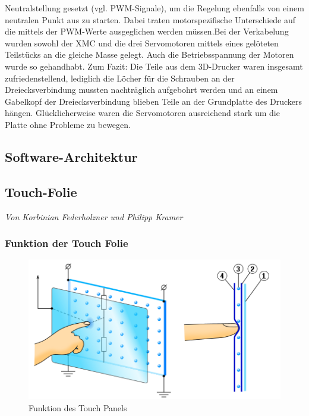 \documentclass[12pt,a4paper,bibliography=totoc,listof=totoc]{scrartcl}
\begin{document}
Neutralstellung gesetzt (vgl. PWM-Signale), um die Regelung ebenfalls von einem neutralen Punkt aus zu 
starten. Dabei traten motorspezifische Unterschiede auf die mittels der PWM-Werte ausgeglichen werden 
müssen.Bei der Verkabelung wurden sowohl der XMC und die drei Servomotoren mittels eines gelöteten 
Teilstücks an die gleiche Masse gelegt. Auch die Betriebsspannung der Motoren wurde so gehandhabt.
Zum Fazit:
Die Teile aus dem 3D-Drucker waren insgesamt zufriedenstellend, lediglich die Löcher für die Schrauben 
an der Dreiecksverbindung mussten nachträglich aufgebohrt werden und an einem Gabelkopf der 
Dreiecksverbindung blieben Teile an der Grundplatte des Druckers hängen. Glücklicherweise waren die 
Servomotoren ausreichend stark um die Platte ohne Probleme zu bewegen.

\subsection{Software-Architektur}

\subsection{Touch-Folie} \label{subsec:Touch-Folie}
\textit{Von Korbinian Federholzner und Philipp Kramer}\newline
\subsubsection{Funktion der Touch Folie}

\begin{figure}[htbp]
	\centering
	\includegraphics[scale = 0.6]{pics/TouchScreen_5wires.png}
	\caption{Funktion des Touch Panels} 
	\label{fig:TouchPanelFunction}
\end{figure}
\end{document}
